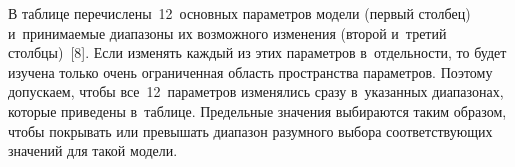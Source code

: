 \begin{multicols}{2}
  В таблице перечислены~12~основных параметров модели (первый столбец) 
и~принимаемые диапазоны их возможного изменения (второй и~третий 
столбцы)~[8]. Если изменять каждый из этих параметров в~отдельности, то 
будет изучена только очень ограниченная область пространства па\-ра\-мет\-ров. 
Поэтому допускаем, чтобы все~12~па\-ра\-мет\-ров изменялись сразу в~указанных 
диапазонах, которые приведены в~таб\-ли\-це. Предельные значения выбираются 
таким образом, чтобы покрывать или превышать диапазон разумного выбора 
со\-от\-вет\-ст\-ву\-ющих значений для такой модели.

\end{multicols}

 \begin{figure*}[b] %
   \vspace*{-7pt}
\begin{center}
\mbox{%
\epsfxsize=157.963mm
}
\end{center}
\vspace*{-11pt}
\end{figure*}

